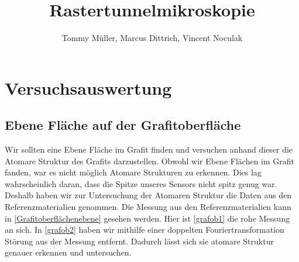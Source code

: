 \documentclass[10pt,a4paper]{article}
\author{Tommy Müller, Marcus Dittrich, Vincent Noculak}
\title{Rastertunnelmikroskopie}
\begin{document}
\maketitle
\newpage
\tableofcontents
\newpage

\section{Versuchsauswertung}

\subsection{Ebene Fläche auf der Grafitoberfläche}

Wir sollten eine Ebene Fläche im Grafit finden und versuchen anhand dieser die Atomare Struktur des Grafits darzustellen. Obwohl wir Ebene Flächen im Grafit fanden, war es nicht möglich Atomare Strukturen zu erkennen. Dies lag wahrscheinlich daran, dass die Spitze unseres Sensors nicht spitz genug war. Deshalb haben wir zur Untersuchung der Atomaren Struktur die Daten aus den Referenzmaterialien genommen. Die Messung aus den Referenzmaterialien kann in \ref{Grafitoberflächenebene} gesehen werden. Hier ist \ref{grafob1} die rohe Messung an sich. In \ref{grafob2} haben wir mithilfe einer doppelten Fouriertransformation Störung aus der Messung entfernt. Dadurch lässt sich sie atomare Struktur genauer erkennen und untersuchen.
\end{document}
